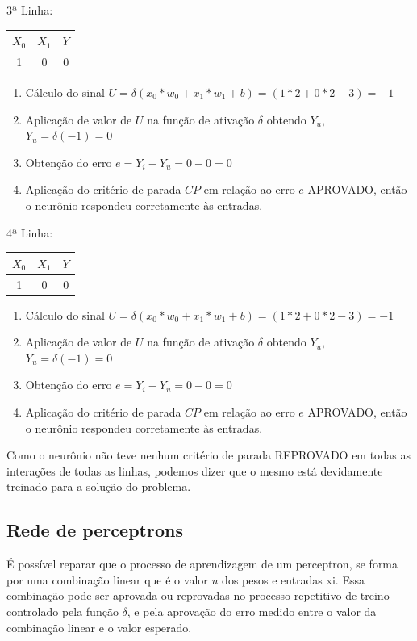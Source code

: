 \documentclass[	12pt, Times, openright, twoside, a4paper, english, brazil]{abntex2}
\begin{document}
            	3ª Linha:
            	\begin{tabular}{|c|c|c|}
            		\hline  \textbf{$X_0$} & \textbf{$X_1$} &  \textbf{$Y$}\\
            		\hline 1 & 0 & 0\\
            	\end{tabular}
            	\begin{enumerate}
            		\item Cálculo do sinal $U = \delta(x_0*w_0 + x_1*w_1 +b) = (1*2 + 0*2 -3) = -1$
            		\item Aplicação de valor de $U$ na função de ativação $\delta$ obtendo $Y_u$, $Y_u = \delta(-1) = 0$
            		\item Obtenção do erro $e = Y_i-Y_u = 0 - 0 = 0$
            		\item Aplicação do critério de parada $CP$ em relação ao erro $e$ APROVADO, então o neurônio respondeu corretamente às entradas.
            	\end{enumerate}
            
            	4ª Linha:
            	\begin{tabular}{|c|c|c|}
            		\hline  \textbf{$X_0$} & \textbf{$X_1$} &  \textbf{$Y$}\\
            		\hline 1 & 0 & 0\\
            	\end{tabular}
            	\begin{enumerate}
            		\item Cálculo do sinal $U = \delta(x_0*w_0 + x_1*w_1 +b) = (1*2 + 0*2 -3) = -1$
            		\item Aplicação de valor de $U$ na função de ativação $\delta$ obtendo $Y_u$, $Y_u = \delta(-1) = 0$
            		\item Obtenção do erro $e = Y_i-Y_u = 0 - 0 = 0$
            		\item Aplicação do critério de parada $CP$ em relação ao erro $e$ APROVADO, então o neurônio respondeu corretamente às entradas.
            	\end{enumerate}
           
           		Como o neurônio não teve nenhum critério de parada REPROVADO em todas as interações de todas as linhas, podemos dizer que o mesmo está devidamente treinado para a solução do problema.
            
        \subsection{Rede de perceptrons}
          É possível reparar que o processo de aprendizagem de um perceptron, se forma por uma combinação linear que é o valor $ u $ dos pesos e entradas xi. Essa combinação pode ser aprovada ou reprovadas no processo repetitivo de treino controlado pela função $\delta$, e pela aprovação do erro medido entre o valor da combinação linear e o valor esperado.
          
\end{document}

